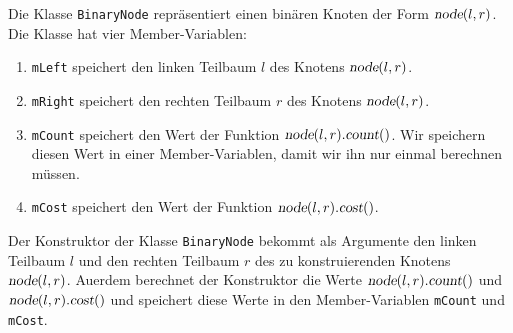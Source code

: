 Die Klasse \texttt{BinaryNode} repr\"asentiert einen bin\"aren Knoten der Form
$\textsl{node}(l,r)$.  Die Klasse hat vier Member-Variablen:
\begin{enumerate}
\item \texttt{mLeft}  speichert den linken  Teilbaum $l$ des Knotens $\textsl{node}(l,r)$.
\item \texttt{mRight} speichert den rechten Teilbaum $r$ des Knotens $\textsl{node}(l,r)$.
\item \texttt{mCount} speichert den Wert der Funktion $\textsl{node}(l,r).\textsl{count}()$.
      Wir speichern diesen Wert in einer Member-Variablen, damit wir ihn nur einmal berechnen
      m\"ussen.
\item \texttt{mCost}  speichert den Wert der Funktion $\textsl{node}(l,r).\textsl{cost}()$.
\end{enumerate}
Der Konstruktor der Klasse \texttt{BinaryNode} bekommt als Argumente den linken Teilbaum $l$ und den
rechten Teilbaum $r$ des zu konstruierenden Knotens $\textsl{node}(l,r)$.  Au\3erdem berechnet der
Konstruktor die Werte $\textsl{node}(l,r).\textsl{count}()$ und $\textsl{node}(l,r).\textsl{cost}()$
und speichert diese Werte in den Member-Variablen \texttt{mCount} und \texttt{mCost}.


